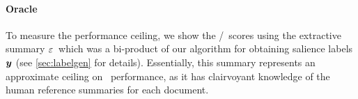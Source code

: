 \paragraph{Oracle} To measure the performance ceiling, we show the
\rouge/\meteor~scores using the extractive summary $\varepsilon$~which was
a bi-product of our algorithm for obtaining salience labels $\boldsymbol{y}$ (see
\autoref{sec:labelgen} for details). Essentially, this summary represents an
approximate ceiling on \rouge~performance, as it has clairvoyant knowledge of
the human reference summaries for each document.
